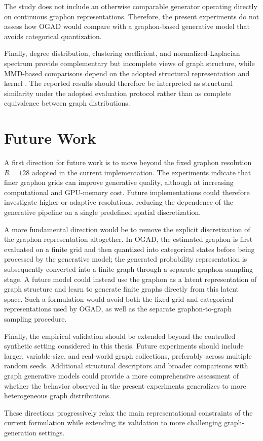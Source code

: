 The study does not include an otherwise comparable generator operating directly on continuous graphon representations. Therefore, the present experiments do not assess how OGAD would compare with a graphon-based generative model that avoids categorical quantization.

Finally, degree distribution, clustering coefficient, and normalized-Laplacian spectrum provide complementary but incomplete views of graph structure, while MMD-based comparisons depend on the adopted structural representation and kernel \cite{obray2022evaluation}. The reported results should therefore be interpreted as structural similarity under the adopted evaluation protocol rather than as complete equivalence between graph distributions.

\section{Future Work}
\label{sec:conclusions_future_work}

A first direction for future work is to move beyond the fixed graphon resolution \(R=128\) adopted in the current implementation. The experiments indicate that finer graphon grids can improve generative quality, although at increasing computational and GPU-memory cost. Future implementations could therefore investigate higher or adaptive resolutions, reducing the dependence of the generative pipeline on a single predefined spatial discretization.

A more fundamental direction would be to remove the explicit discretization of the graphon representation altogether. In OGAD, the estimated graphon is first evaluated on a finite grid and then quantized into categorical states before being processed by the generative model; the generated probability representation is subsequently converted into a finite graph through a separate graphon-sampling stage. A future model could instead use the graphon as a latent representation of graph structure and learn to generate finite graphs directly from this latent space. Such a formulation would avoid both the fixed-grid and categorical representations used by OGAD, as well as the separate graphon-to-graph sampling procedure.

Finally, the empirical validation should be extended beyond the controlled synthetic setting considered in this thesis. Future experiments should include larger, variable-size, and real-world graph collections, preferably across multiple random seeds. Additional structural descriptors and broader comparisons with graph generative models could provide a more comprehensive assessment of whether the behavior observed in the present experiments generalizes to more heterogeneous graph distributions.

These directions progressively relax the main representational constraints of the current formulation while extending its validation to more challenging graph-generation settings.